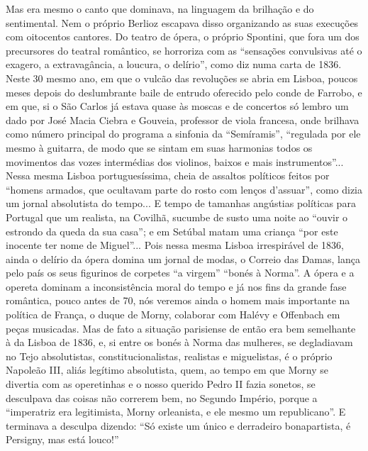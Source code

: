 Mas era mesmo o canto que dominava, na linguagem da brilhação e do
sentimental. Nem o próprio Berlioz escapava disso organizando as suas
execuções com oitocentos cantores. Do teatro de ópera, o próprio
Spontini, que fora um dos precursores do teatral romântico, se horroriza
com as ``sensações convulsivas até o exagero, a extravagância, a
loucura, o delírio'', como diz numa carta de 1836. Neste 30 mesmo ano,
em que o vulcão das revoluções se abria em Lisboa, poucos meses depois
do deslumbrante baile de entrudo oferecido pelo conde de Farrobo, e em
que, si o São Carlos já estava quase às moscas e de concertos só lembro
um dado por José Macia Ciebra e Gouveia, professor de viola francesa,
onde brilhava como número principal do programa a sinfonia da
``Semíramis'', ``regulada por ele mesmo à guitarra, de modo que se
sintam em suas harmonias todos os movimentos das vozes intermédias dos
violinos, baixos e mais instrumentos''... Nessa mesma Lisboa
portuguesíssima, cheia de assaltos políticos feitos por ``homens
armados, que ocultavam parte do rosto com lenços d'assuar'', como dizia
um jornal absolutista do tempo... E tempo de tamanhas angústias
políticas para Portugal que um realista, na Covilhã, sucumbe de susto
uma noite ao ``ouvir o estrondo da queda da sua casa''; e em Setúbal
matam uma criança ``por este inocente ter nome de Miguel''... Pois nessa
mesma Lisboa irrespirável de 1836, ainda o delírio da ópera domina um
jornal de modas, o Correio das Damas, lança pelo país os seus figurinos
de corpetes ``a virgem'' ``bonés à Norma''. A ópera e a opereta dominam
a inconsistência moral do tempo e já nos fins da grande fase romântica,
pouco antes de 70, nós veremos ainda o homem mais importante na política
de França, o duque de Morny, colaborar com Halévy e Offenbach em peças
musicadas. Mas de fato a situação parisiense de então era bem semelhante
à da Lisboa de 1836, e, si entre os bonés à Norma das mulheres, se
degladiavam no Tejo absolutistas, constitucionalistas, realistas e
miguelistas, é o próprio Napoleão III, aliás legítimo absolutista, quem,
ao tempo em que Morny se divertia com as operetinhas e o nosso querido
Pedro II fazia sonetos, se desculpava das coisas não correrem bem, no
Segundo Império, porque a ``imperatriz era legitimista, Morny
orleanista, e ele mesmo um republicano''. E terminava a desculpa
dizendo: ``Só existe um único e derradeiro bonapartista, é Persigny, mas
está louco!''

